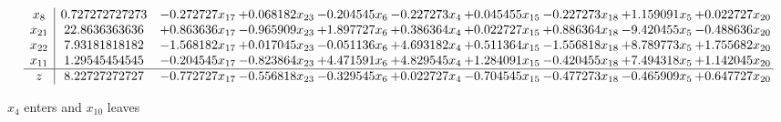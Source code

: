 \documentclass[10pt]{article}
\begin{document}
\[\begin{array}{c| c c@{\hskip 2pt} c@{\hskip 2pt} c@{\hskip 2pt} c@{\hskip 2pt} c@{\hskip 2pt} c@{\hskip 2pt} c@{\hskip 2pt} c@{\hskip 2pt} }
 x_{8}   &  0.727272727273 & -0.272727 x_{17} & + 0.068182 x_{23} & -0.204545 x_{6} & -0.227273 x_{4} & + 0.045455 x_{15} & -0.227273 x_{18} & + 1.159091 x_{5} & + 0.022727 x_{20}\\
 x_{21}   &  22.8636363636 & + 0.863636 x_{17} & -0.965909 x_{23} & + 1.897727 x_{6} & + 0.386364 x_{4} & + 0.022727 x_{15} & + 0.886364 x_{18} & -9.420455 x_{5} & -0.488636 x_{20}\\
 x_{22}   &  7.93181818182 & -1.568182 x_{17} & + 0.017045 x_{23} & -0.051136 x_{6} & + 4.693182 x_{4} & + 0.511364 x_{15} & -1.556818 x_{18} & + 8.789773 x_{5} & + 1.755682 x_{20}\\
 x_{11}   &  1.29545454545 & -0.204545 x_{17} & -0.823864 x_{23} & + 4.471591 x_{6} & + 4.829545 x_{4} & + 1.284091 x_{15} & -0.420455 x_{18} & + 7.494318 x_{5} & + 1.142045 x_{20}\\
\hline
z    &  8.22727272727 & -0.772727 x_{17} & -0.556818 x_{23} & -0.329545 x_{6} & + 0.022727 x_{4} & -0.704545 x_{15} & -0.477273 x_{18} & -0.465909 x_{5} & + 0.647727 x_{20}\\
\end{array}\]


 $ x_{4} $ enters and $ x_{10} $ leaves 
\end{document}
